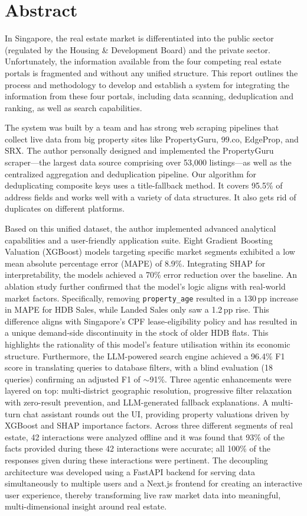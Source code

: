 \chapter*{Abstract}

In Singapore, the real estate market is differentiated into the public sector (regulated by the Housing \& Development Board) and the private sector. Unfortunately, the information available from the four competing real estate portals is fragmented and without any unified structure. This report outlines the process and methodology to develop and establish a system for integrating the information from these four portals, including data scanning, deduplication and ranking, as well as search capabilities.

The system was built by a team and has strong web scraping pipelines that collect live data from big property sites like PropertyGuru, 99.co, EdgeProp, and SRX. The author personally designed and implemented the PropertyGuru scraper—the largest data source comprising over 53,000 listings—as well as the centralized aggregation and deduplication pipeline. Our algorithm for deduplicating composite keys uses a title-fallback method. It covers 95.5\% of address fields and works well with a variety of data structures. It also gets rid of duplicates on different platforms.

Based on this unified dataset, the author implemented advanced analytical capabilities and a user-friendly application suite. Eight Gradient Boosting Valuation (XGBoost) models targeting specific market segments exhibited a low mean absolute percentage error (MAPE) of 8.9\%. Integrating SHAP for interpretability, the models achieved a 70\% error reduction over the baseline. An ablation study further confirmed that the model's logic aligns with real-world market factors. Specifically, removing \texttt{property\_age} resulted in a 130\,pp increase in MAPE for HDB Sales, while Landed Sales only saw a 1.2\,pp rise. This difference aligns with Singapore's CPF lease-eligibility policy and has resulted in a unique demand-side discontinuity in the stock of older HDB flats. This highlights the rationality of this model's feature utilisation within its economic structure. Furthermore, the LLM-powered search engine achieved a 96.4\% F1 score in translating queries to database filters, with a blind evaluation (18 queries) confirming an adjusted F1 of $\sim$91\%. Three agentic enhancements were layered on top: multi-district geographic resolution, progressive filter relaxation with zero-result prevention, and LLM-generated fallback explanations. A multi-turn chat assistant rounds out the UI, providing property valuations driven by XGBoost and SHAP importance factors. Across three different segments of real estate, 42 interactions were analyzed offline and it was found that 93\% of the facts provided during these 42 interactions were accurate; all 100\% of the responses given during these interactions were pertinent. The decoupling architecture was developed using a FastAPI backend for serving data simultaneously to multiple users and a Next.js frontend for creating an interactive user experience, thereby transforming live raw market data into meaningful, multi-dimensional insight around real estate.